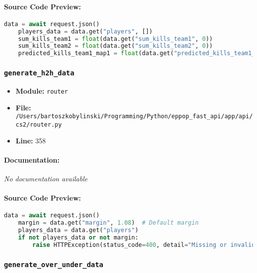\documentclass[11pt,a4paper]{article}
\begin{document}
\paragraph{Source Code Preview:}
\begin{lstlisting}[language=Python]
    data = await request.json()
    players_data = data.get("players", [])
    sum_kills_team1 = float(data.get("sum_kills_team1", 0))
    sum_kills_team2 = float(data.get("sum_kills_team2", 0))
    predicted_kills_team1_map1 = float(data.get("predicted_kills_team1_map1", 0)) / 2
\end{lstlisting}

\vspace{1em}
\subsubsection{\texttt{generate\_h2h\_data}}

\begin{itemize}
    \item \textbf{Module:} \texttt{router}
    \item \textbf{File:} \texttt{/Users/bartoszkobylinski/Programming/Python/eppop\_fast\_api/app/api/cs2/router.py}
    \item \textbf{Line:} 358
\end{itemize}

\paragraph{Documentation:} \textit{No documentation available}

\paragraph{Source Code Preview:}
\begin{lstlisting}[language=Python]
    data = await request.json()
    margin = data.get("margin", 1.08)  # Default margin
    players_data = data.get("players")
    if not players_data or not margin:
        raise HTTPException(status_code=400, detail="Missing or invalid data in the request")
\end{lstlisting}

\vspace{1em}
\subsubsection{\texttt{generate\_over\_under\_data}}
\end{document}
